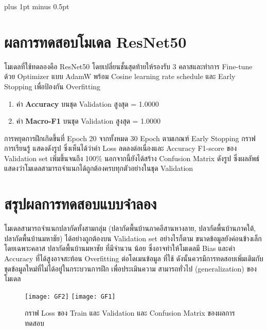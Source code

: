 
\clearpage
\thispagestyle{plain}

\begingroup
\fontsize{16pt}{19.2pt}\selectfont
\justifying
\XeTeXlinebreakskip=0pt plus 1pt minus 0.5pt
\setlength{\parindent}{1.5cm}
\setlength{\parskip}{0pt}

\section*{ผลการทดสอบโมเดล ResNet50}

\indent โมเดลที่ใช้ทดลองคือ ResNet50 โดยเปลี่ยนชั้นสุดท้ายให้รองรับ 3 คลาสและทำการ
Fine-tune ด้วย Optimizer แบบ AdamW พร้อม Cosine learning rate schedule และ Early
Stopping เพื่อป้องกัน Overfitting

\begin{sloppypar}
	\begin{enumerate}
		\item ค่า \textbf{Accuracy} บนชุด Validation สูงสุด = 1.0000
		\item ค่า \textbf{Macro-F1} บนชุด Validation สูงสุด = 1.0000
	\end{enumerate}
\end{sloppypar}

\indent การหยุดการฝึกเกิดขึ้นที่ Epoch 20 จากทั้งหมด 30 Epoch ตามเกณฑ์ Early Stopping กราฟการเรียนรู้ แสดงดังรูป ซึ่งเห็นได้ว่าค่า Loss ลดลงต่อเนื่องและ Accuracy
F1-score ของ Validation set เพิ่มขึ้นจนถึง 100\% นอกจากนี้ยังได้สร้าง Confusion Matrix ดังรูป ซึ่งผลลัพธ์แสดงว่าโมเดลสามารถจำแนกได้ถูกต้องครบทุกตัวอย่างในชุด Validation

\vspace{\baselineskip}

\section*{สรุปผลการทดสอบแบบจำลอง}
\indent โมเดลสามารถจำแนกปลากัดทั้งสามกลุ่ม (ปลากัดพื้นบ้านภาคอีสานหางลาย, ปลากัดพื้นบ้านภาคใต้, ปลากัดพื้นบ้านมหาชัย) ได้อย่างถูกต้องบน
Validation set อย่างไรก็ตาม ขนาดข้อมูลยังค่อนข้างเล็กโดยเฉพาะคลาส ปลากัดพื้นบ้านมหาชัย ที่มีจำนวน
น้อย ซึ่งอาจทำให้โมเดลมี Bias และค่า Accuracy ที่ได้สูงอาจสะท้อน Overfitting ต่อโดเมนข้อมูล
ที่ใช้ ดังนั้นควรมีการทดสอบเพิ่มเติมกับชุดข้อมูลใหม่ที่ไม่ได้อยู่ในกระบวนการฝึก เพื่อประเมินความ
สามารถทั่วไป (generalization) ของโมเดล



\begin{figure}[h]
	\centering
	\texttt{[image: GF2]}
	\hfill
	\texttt{[image: GF1]}
	\caption{กราฟ Loss ของ Train และ Validation และ Confusion Matrix ของผลการทดสอบ}
\end{figure}

\endgroup


